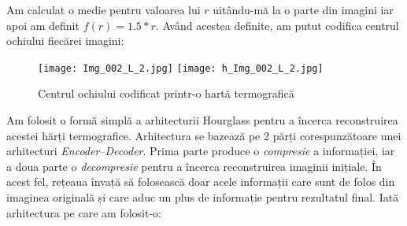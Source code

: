 Am calculat o medie pentru valoarea lui $r$ uitându-mă la o parte din imagini iar apoi am definit $f(r) = 1.5 * r$.
Având acestea definite, am putut codifica centrul ochiului fiecărei imagini:

\begin{figure}[h]
    \centering
    \texttt{[image: Img\_002\_L\_2.jpg]}
    \texttt{[image: h\_Img\_002\_L\_2.jpg]}
    \caption{Centrul ochiului codificat printr-o hartă termografică}
\end{figure}

Am folosit o formă simplă a arhitecturii Hourglass pentru a încerca reconstruirea acestei hărți termografice.
Arhitectura se bazează pe 2 părți corespunzătoare unei arhitecturi \emph{Encoder–Decoder}.
Prima parte produce o \emph{compresie} a informației, iar a doua parte o \emph{decompresie} pentru a încerca reconstruirea imaginii inițiale.
În acest fel, rețeaua învață să folosească doar acele informații care sunt de folos din imaginea originală și care aduc un plus de informație pentru rezultatul final.
Iată arhitectura pe care am folosit-o:

